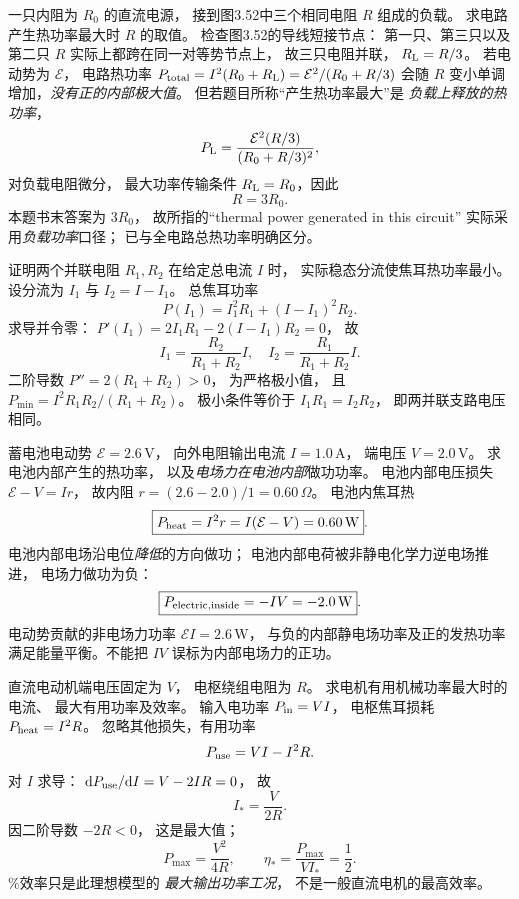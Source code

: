 一只内阻为 $R_0$ 的直流电源，
接到图3.52中三个相同电阻 $R$ 组成的负载。
求电路产生热功率最大时 $R$ 的取值。
\exsolution
检查图3.52的导线短接节点：
第一只、第三只以及第二只 $R$
实际上都跨在同一对等势节点上，
故三只电阻并联，
$R_{\rm L}=R/3$。
若电动势为 $\mathcal E$，
电路热功率
$P_{\rm total}=I^2(R_0+R_{\rm L})
=\mathcal E^2/(R_0+R/3)$
会随 $R$ 变小单调增加，\emph{没有正的内部极大值}。
但若题目所称“产生热功率最大”是
\emph{负载上释放的热功率}，
\[
P_{\rm L}=\frac{\mathcal E^2(R/3)}
{(R_0+R/3)^2},
\]
对负载电阻微分，
最大功率传输条件
$R_{\rm L}=R_0$，因此
\[
\boxed{R=3R_0}.
\]
\excheck 本题书末答案为 $3R_0$，
故所指的“thermal power generated in this circuit”
实际采用\emph{负载功率}口径；
已与全电路总热功率明确区分。

证明两个并联电阻 $R_1,R_2$
在给定总电流 $I$ 时，
实际稳态分流使焦耳热功率最小。
\exsolution
设分流为 $I_1$ 与 $I_2=I-I_1$。
总焦耳功率
\[
P(I_1)=I_1^2R_1+(I-I_1)^2R_2.
\]
求导并令零：
$P'(I_1)=2I_1R_1-2(I-I_1)R_2=0$，
故
\[
\boxed{I_1=\frac{R_2}{R_1+R_2}I,\quad
I_2=\frac{R_1}{R_1+R_2}I}.
\]
二阶导数
$P''=2(R_1+R_2)>0$，
为严格极小值，
且
$P_{\min}=I^2R_1R_2/(R_1+R_2)$。
\excheck 极小条件等价于
$I_1R_1=I_2R_2$，
即两并联支路电压相同。

蓄电池电动势 $\mathcal E=2.6\,\mathrm V$，
向外电阻输出电流 $I=1.0\,\mathrm A$，
端电压 $V=2.0\,\mathrm V$。
求电池内部产生的热功率，
以及\emph{电场力在电池内部}做功功率。
\exsolution
电池内部电压损失
$\mathcal E-V=Ir$，
故内阻 $r=(2.6-2.0)/1=0.60\,\Omega$。
电池内焦耳热
\[
\boxed{P_{\rm heat}=I^2r=I(\mathcal E-V)
=0.60\,\mathrm W}.
\]
电池内部电场沿电位\emph{降低}的方向做功；
电池内部电荷被非静电化学力逆电场推进，
电场力做功为负：
\[
\boxed{P_{\rm electric,inside}=-IV=-2.0\,\mathrm W}.
\]
\excheck 电动势贡献的非电场力功率
$\mathcal EI=2.6\,\mathrm W$，
与负的内部静电场功率及正的发热功率
满足能量平衡。不能把 $IV$ 误标为内部电场力的正功。

直流电动机端电压固定为 $V$，
电枢绕组电阻为 $R$。
求电机有用机械功率最大时的电流、
最大有用功率及效率。
\exsolution
输入电功率 $P_{\rm in}=VI$，
电枢焦耳损耗 $P_{\rm heat}=I^2R$。
忽略其他损失，有用功率
\[
P_{\rm use}=VI-I^2R.
\]
对 $I$ 求导：
$\mathrm dP_{\rm use}/\mathrm dI=V-2IR=0$，
故
\[
\boxed{I_*=\frac V{2R}}.
\]
因二阶导数 $-2R<0$，
这是最大值；
\[
\boxed{P_{\max}=\frac{V^2}{4R}},
\qquad
\boxed{\eta_*=\frac{P_{\max}}{VI_*}=\frac12}.
\]
\%效率只是此理想模型的
\emph{最大输出功率工况}，
不是一般直流电机的最高效率。

